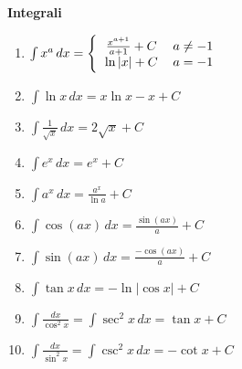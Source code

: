 \textbf{Integrali}
\begin{center}
	\begin{small}
		\begin{enumerate}
			\item \begin{math}
				      \int x^a\,dx =
				      \Bigg\{\begin{tabular}{ccc}
					      $\frac{x^{a+1}}{a+1} + C$  & $a \neq -1$ & \\
					      $ \ln{\left|x\right|} + C$ & $a = -1$    & \\
				      \end{tabular}
			      \end{math}
			\item \begin{math}
				      \int \ln {x}\,dx = x \ln {x} - x + C
			      \end{math}
			\item \begin{math}
				      \int \frac {1}{\sqrt{x}}\,dx=2\sqrt{x} + C
			      \end{math}
			\item \begin{math}
				      \int e^x\,dx = e^x + C
			      \end{math}
			\item \begin{math}
				      \int a^x\,dx = \frac{a^x}{\ln{a}} + C
			      \end{math}
			\item \begin{math}
				      \int \cos({ax}) \, dx = { \frac{\sin (ax)}{a} } + C
			      \end{math}
			\item \begin{math}
				      \int \sin({ax}) \, dx = { \frac{-\cos(ax)}{a} } + C
			      \end{math}
			\item \begin{math}
				      \int \tan{x} \, dx = -\ln{\left| \cos {x} \right|} + C
			      \end{math}
			\item \begin{math}
				      \int \frac{dx}{\cos^2 x}=\int \sec^2 x \, dx = \tan x + C
			      \end{math}
			\item \begin{math}
				      \int \frac{dx}{\sin^2 x}=\int \csc^2 x \, dx = -\cot x + C

\end{math}
\end{enumerate}
\end{small}
\end{center}
